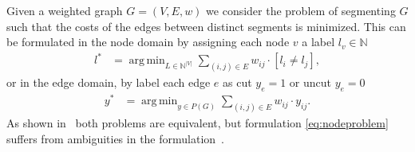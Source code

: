 \documentclass[10pt,twocolumn,letterpaper]{article}
\DeclareMathOperator*{\argmin}{arg\,min}
\begin{document}




Given a weighted graph $G=(V,E,w)$ we consider the problem of segmenting $G$ such that the costs
of the edges between distinct segments is minimized. This can be formulated in the node domain
by assigning each node $v$ a label $l_v \in \mathbb{N}$
\begin{align}
  l^* &= \argmin_{L \in \mathbb{N}^{|V|}} \sum_{ (i,j) \in E } w_{ij} \cdot [l_{i} \neq l_{j}], \label{eq:nodeproblem}
\end{align}  %
or in the edge domain, by label each edge $e$ as cut $y_e=1$ or uncut $y_e=0$ 
\begin{align}
  y^* &= \argmin_{y \in P(G)} \sum_{ (i,j) \in E } w_{ij} \cdot y_{ij} \label{eq:edgeproblem}.%
\end{align}
As shown in~\cite{kappes_2013_arxiv} both problems are equivalent, but formulation \ref{eq:nodeproblem}
suffers from ambiguities in the formulation~\cite{kappes_2011_emmcvpr}.



\end{document}
